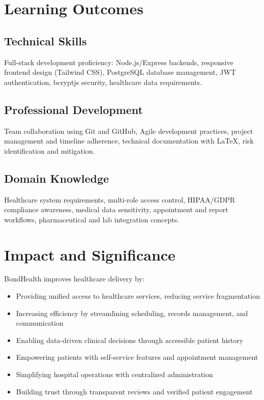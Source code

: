 \section{Learning Outcomes}

\subsection{Technical Skills}
Full-stack development proficiency: Node.js/Express backends, responsive frontend design (Tailwind CSS), PostgreSQL database management, JWT authentication, bcryptjs security, healthcare data requirements.

\subsection{Professional Development}
Team collaboration using Git and GitHub, Agile development practices, project management and timeline adherence, technical documentation with LaTeX, risk identification and mitigation.

\subsection{Domain Knowledge}
Healthcare system requirements, multi-role access control, HIPAA/GDPR compliance awareness, medical data sensitivity, appointment and report workflows, pharmaceutical and lab integration concepts.

\section{Impact and Significance}

BondHealth improves healthcare delivery by:

\begin{itemize}
    \item Providing unified access to healthcare services, reducing service fragmentation
    \item Increasing efficiency by streamlining scheduling, records management, and communication
    \item Enabling data-driven clinical decisions through accessible patient history
    \item Empowering patients with self-service features and appointment management
    \item Simplifying hospital operations with centralized administration
    \item Building trust through transparent reviews and verified patient engagement
\end{itemize}

